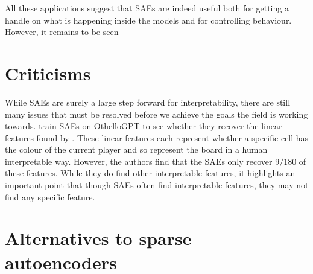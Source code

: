All these applications suggest that SAEs are indeed useful both for getting a handle on what is happening inside the models and for controlling behaviour.
However, it remains to be seen 



\section{Criticisms}
While SAEs are surely a large step forward for interpretability, there are still many issues that must be resolved before we achieve the goals the field is working towards.
\cite{robert_huben_research_2024} train SAEs on OthelloGPT \cite{li_emergent_2023} to see whether they recover the linear features found by \cite{neel_nanda_actually_2023}.
These linear features each represent whether a specific cell has the colour of the current player and so represent the board in a human interpretable way.
However, the authors find that the SAEs only recover $9/180$ of these features.
While they do find other interpretable features, it highlights an important point that though SAEs often find interpretable features, they may not find any specific feature.



\section{Alternatives to sparse autoencoders}\label{sec:alternatives_to_saes}

